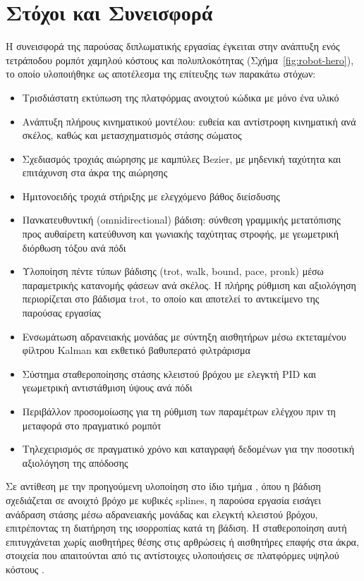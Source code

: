 \documentclass[11pt]{report}
\begin{document}
\section{Στόχοι και Συνεισφορά}
Η συνεισφορά της παρούσας διπλωματικής εργασίας έγκειται στην ανάπτυξη ενός
τετράποδου ρομπότ χαμηλού κόστους και πολυπλοκότητας
(Σχήμα~\ref{fig:robot-hero}), το οποίο υλοποιήθηκε ως
αποτέλεσμα της επίτευξης των παρακάτω στόχων:
\begin{itemize}
  \item Τρισδιάστατη εκτύπωση της πλατφόρμας ανοιχτού κώδικα με μόνο ένα υλικό
  \item Ανάπτυξη πλήρους κινηματικού μοντέλου: ευθεία και αντίστροφη κινηματική
  ανά σκέλος, καθώς και μετασχηματισμός στάσης σώματος
  \item Σχεδιασμός τροχιάς αιώρησης με καμπύλες Bezier, με μηδενική ταχύτητα
  και επιτάχυνση στα άκρα της αιώρησης
  \item Ημιτονοειδής τροχιά στήριξης με ελεγχόμενο βάθος διείσδυσης
  \item Πανκατευθυντική (omnidirectional) βάδιση: σύνθεση γραμμικής μετατόπισης
  προς αυθαίρετη κατεύθυνση και γωνιακής ταχύτητας στροφής, με γεωμετρική
  διόρθωση τόξου ανά πόδι
  \item Υλοποίηση πέντε τύπων βάδισης (trot, walk, bound, pace, pronk) μέσω
  παραμετρικής κατανομής φάσεων ανά σκέλος. Η πλήρης ρύθμιση και αξιολόγηση
  περιορίζεται στο βάδισμα trot, το οποίο και αποτελεί το αντικείμενο της
  παρούσας εργασίας
  \item Ενσωμάτωση αδρανειακής μονάδας με σύντηξη αισθητήρων μέσω εκτεταμένου
  φίλτρου Kalman και εκθετικό βαθυπερατό φιλτράρισμα
  \item Σύστημα σταθεροποίησης στάσης κλειστού βρόχου με ελεγκτή PID και
  γεωμετρική αντιστάθμιση ύψους ανά πόδι
  \item Περιβάλλον προσομοίωσης για τη ρύθμιση των παραμέτρων ελέγχου πριν τη
  μεταφορά στο πραγματικό ρομπότ
  \item Τηλεχειρισμός σε πραγματικό χρόνο και καταγραφή δεδομένων για την
  ποσοτική αξιολόγηση της απόδοσης
\end{itemize}

Σε αντίθεση με την προηγούμενη υλοποίηση στο ίδιο τμήμα
\cite{tsiatsianas_quadruped_2024}, όπου η βάδιση σχεδιάζεται σε ανοιχτό βρόχο με
κυβικές splines, η παρούσα εργασία εισάγει ανάδραση στάσης μέσω αδρανειακής
μονάδας και ελεγκτή κλειστού βρόχου, επιτρέποντας τη διατήρηση της ισορροπίας
κατά τη βάδιση. Η σταθεροποίηση αυτή επιτυγχάνεται χωρίς αισθητήρες θέσης στις
αρθρώσεις ή αισθητήρες επαφής στα άκρα, στοιχεία που απαιτούνται από τις
αντίστοιχες υλοποιήσεις σε πλατφόρμες υψηλού κόστους
\cite{hyun_high_2014,hutter_anymal_2016}.
\end{document}
